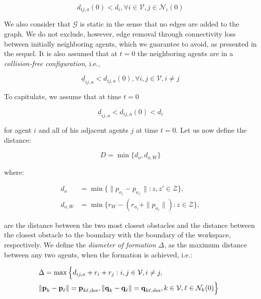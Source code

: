 \begin{equation} \label{eq:initially_connected}
  d_{ij,a}(0) < d_i, \forall i \in \mathcal{V}, j \in \mathcal{N}_i(0)
\end{equation}

We also consider that $\mathcal{G}$ is static in the sense that no edges are
added to the graph. We do not exclude, however, edge removal through
connectivity loss between initially neighboring agents, which we guarantee
to avoid, as presented in the sequel. It is also assumed that at $t=0$ the
neighboring agents are in a \textit{collision-free configuration}, i.e.,

\begin{equation}
  \underline{d}_{ij, a} < d_{ij,a}(0), \forall i,j \in \mathcal{V}, i \neq j
\label{eq:initially_coll_free}
\end{equation}

To capitulate, we assume that at time $t=0$

$$\underline{d}_{ij,a} < d_{ij,a}(0) < d_i$$

for agent $i$ and all of his adjacent agents $j$ at time $t=0$. Let us now
define the distance:

\begin{equation*}
  D = \min\{d_o, d_{o,W}\}
\end{equation*}

where:

\begin{align*}
d_o &= \min\{\| p_{o_z} - p_{o_{z'}}\| : z,z' \in \mathcal{Z} \}, \\
d_{o,W} &= \min\{r_W - \left( r_{o_z} + \| p_{o_z} \| \right) : z \in \mathcal{Z}\},
\end{align*}

are the distance between the two most closest obstacles and the distance between
the closest obstacle to the boundary with the boundary of the workspace,
respectively. We define the \emph{diameter of formation} $\Delta$, as the
maximum distance between any two agents, when the formation is achieved, i.e.:

\begin{align*}
  &\hspace{-2mm} \Delta =  \max\Big\{d_{ij, a}+r_i+r_j: i, j \in \mathcal{V}, i \neq j, \notag \\
  &\hspace{-2mm} \| \vect{p}_k - \vect{p}_\ell \| = \vect{p}_{k \ell,\text{des}},
  \|\vect{q}_k - \vect{q}_\ell\| = \vect{q}_{k \ell,\text{des}},
  k \in \mathcal{V},
  \ell \in \mathcal{N}_k(0)\Big\}
\end{align*}

